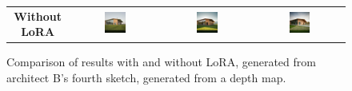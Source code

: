 \begin{figure}[H]
{\begin{tabular}{c c c c}
    \textbf{Without LoRA} &
    \includegraphics[width=0.25\textwidth]{Images/Results/Architect-B_unstructured-phase/generated_images/4/Zonder_lora_00024_.png} &
    \includegraphics[width=0.25\textwidth]{Images/Results/Architect-B_unstructured-phase/generated_images/4/Zonder_lora_00025_.png} & \includegraphics[width=0.25\textwidth]{Images/Results/Architect-B_unstructured-phase/generated_images/4/Zonder_lora_00028_.png} \\
  \end{tabular}
  }
  \caption{Comparison of results with and without LoRA, generated from architect B's fourth sketch, generated from a depth map.}
  \label{fig:lora-comparison-2wide}
\end{figure}

